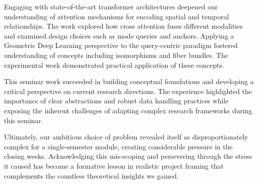 Engaging with state-of-the-art transformer architectures deepened our understanding of attention mechanisms for encoding spatial and temporal relationships. The work explored how cross attention fuses different modalities and examined design choices such as mode queries and anchors. Applying a Geometric Deep Learning perspective to the query-centric paradigm fostered understanding of concepts including isomorphisms and fiber bundles. The experimental work demonstrated practical application of these concepts.

This seminar work succeeded in building conceptual foundations and developing a critical perspective on current research directions. The experience highlighted the importance of clear abstractions and robust data handling practices while exposing the inherent challenges of adapting complex research frameworks during this seminar.

Ultimately, our ambitious choice of problem revealed itself as disproportionately complex for a single-semester module, creating considerable pressure in the closing weeks. Acknowledging this mis-scoping and persevering through the stress it caused has become a formative lesson in realistic project framing that complements the countless theoretical insights we gained.